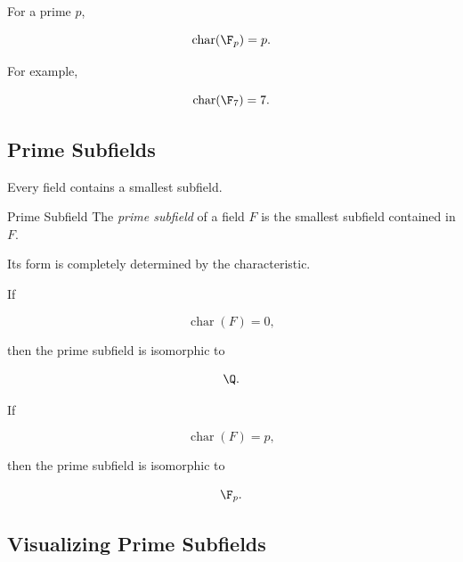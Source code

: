 For a prime \(p\),

\[ \operatorname{char}(\F_p)=p. \]

For example,

\[ \operatorname{char}(\F_7)=7. \]

\subsection{Prime Subfields}
\label{subsec:prime-subfields}

Every field contains a smallest subfield.

\begin{definitionbox}{Prime Subfield}
The \emph{prime subfield} of a field \(F\) is the smallest subfield contained
in \(F\).
\end{definitionbox}

Its form is completely determined by the characteristic.

If

\[ \operatorname{char}(F)=0, \]

then the prime subfield is isomorphic to

\[ \Q. \]

If

\[ \operatorname{char}(F)=p, \]

then the prime subfield is isomorphic to

\[ \F_p. \]

\subsection{Visualizing Prime Subfields}
\label{subsec:visual-prime-subfields}

\begin{center}
\end{center}


